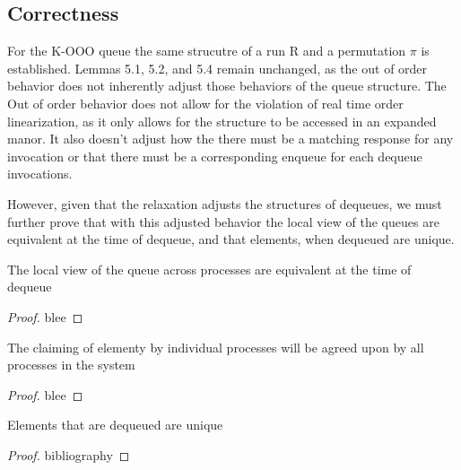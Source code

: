 \documentclass[a4paper,USenglish]{lipics-v2021} %
\begin{document}
\subsection{Correctness}
For the K-OOO queue the same strucutre of a run R and a permutation $\pi$ is established. Lemmas 5.1, 5.2, and 5.4 remain unchanged, as the out of order behavior does not inherently adjust those behaviors of the queue structure. The Out of order behavior does not allow for the violation of real time order linearization, as it only allows for the structure to be accessed in an expanded manor. It also doesn't adjust how the there must be a matching response for any invocation or that there must be a corresponding enqueue for each dequeue invocations. 

However, given that the relaxation adjusts the structures of dequeues, we must further prove that with this adjusted behavior the local view of the queues are equivalent at the time of dequeue, and that elements, when dequeued are unique. 

\begin{lemma}
  The local view of the queue across processes are equivalent at the time of dequeue
\end{lemma}

\begin{proof}
  blee
\end{proof}

\begin{lemma}
    The claiming of elementy by individual processes will be agreed upon by all processes in the system
\end{lemma}

\begin{proof}
  blee
\end{proof}

\begin{lemma}
  Elements that are dequeued are unique
\end{lemma}

\begin{proof}
  bibliography
\end{proof}
\end{document}
